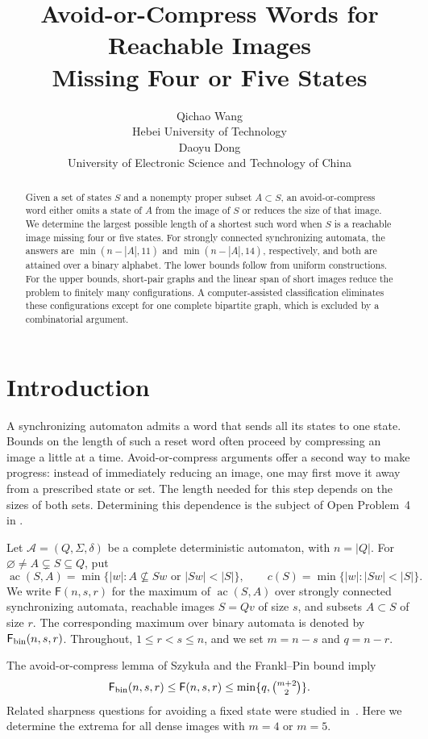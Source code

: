 \documentclass[11pt]{article}
\title{Avoid-or-Compress Words for Reachable Images\\Missing Four or Five States}
\author{Qichao Wang\\[0.15em]
{\normalsize Hebei University of Technology}\\[0.45em]
Daoyu Dong\\[0.15em]
{\normalsize University of Electronic Science and Technology of China}}
\date{}
\theoremstyle{definition}
\theoremstyle{plain}
\newcommand{\ac}{\operatorname{ac}}
\newcommand{\Max}{\mathsf F}
\begin{document}
\maketitle
\begin{abstract}
Given a set of states $S$ and a nonempty proper subset $A\subset S$,
an avoid-or-compress word either omits a state of $A$ from the image of
$S$ or reduces the size of that image. We determine the largest possible
length of a shortest such word when $S$ is a reachable image missing
four or five states. For strongly connected synchronizing automata,
the answers are $\min(n-|A|,11)$ and $\min(n-|A|,14)$, respectively,
and both are attained over a binary alphabet. The lower bounds follow
from uniform constructions. For the upper bounds, short-pair graphs
and the linear span of short images reduce the problem to finitely many
configurations. A computer-assisted classification eliminates these
configurations except for one complete bipartite graph, which is
excluded by a combinatorial argument.
\end{abstract}

\section{Introduction}
A synchronizing automaton admits a word that sends all its states to
one state. Bounds on the length of such a reset word often proceed by
compressing an image a little at a time. Avoid-or-compress arguments
offer a second way to make progress: instead of immediately reducing
an image, one may first move it away from a prescribed state or set.
The length needed for this step depends on the sizes of both sets.
Determining this dependence is the subject of Open Problem~4 in
\cite{szykula2026}.

Let $\mathcal A=(Q,\Sigma,\delta)$ be a complete deterministic automaton,
with $n=|Q|$. For $\varnothing\ne A\subsetneq S\subseteq Q$, put
\[
 \ac(S,A)=\min\{|w|:A\nsubseteq Sw\text{ or }|Sw|<|S|\},
 \qquad c(S)=\min\{|w|:|Sw|<|S|\}.
\]
We write $\Max(n,s,r)$ for the maximum of $\ac(S,A)$ over strongly
connected synchronizing automata, reachable images $S=Qv$ of size $s$,
and subsets $A\subset S$ of size $r$. The corresponding maximum over
binary automata is denoted by $\Max_{\rm bin}(n,s,r)$. Throughout,
$1\le r<s\le n$, and we set $m=n-s$ and $q=n-r$.

The avoid-or-compress lemma of Szyku\l a
\cite{szykula2018,szykula2026} and the Frankl--Pin bound
\cite{frankl1982,pin1983} imply
\begin{equation}\label{eq:universal}
 \Max_{\rm bin}(n,s,r)\le\Max(n,s,r)
 \le\min\{q,\tbinom{m+2}{2}\}.
\end{equation}
Related sharpness questions for avoiding a fixed state were studied
in~\cite{ferens2021}. Here we determine the extrema for all dense
images with $m=4$ or $m=5$.
\end{document}
